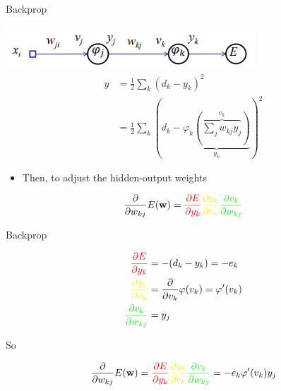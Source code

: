\documentclass[notes]{beamer}
\providecommand{\tightlist}{%
  \setlength{\itemsep}{0pt}\setlength{\parskip}{0pt}}
\begin{document}
\begin{frame}{Backprop}

\centering 

\includegraphics[width=0.70000\textwidth]{2018-03-10-13-49-42.png}\\

\begin{align} 
    y & = \frac{1}{2} \sum_k (d_k - y_k)^2 \\ %
      & =  \frac{1}{2}\sum_k \left(
        d_k - \underbrace{\varphi_k 
        \left( \overbrace{\sum_j w_{kj} y_j}^{v_k} \right)
         }_{y_k}
      \right)^2 
\end{align}

\begin{itemize}
\tightlist
\item
  Then, to adjust the hidden-output weights
\end{itemize}

\begin{equation}
    \frac{\partial }{\partial w_{kj}} E(\vw) = 
    \textcolor{red}{
        \frac{\partial E}{\partial y_k}} 
    \textcolor{yellow}{
        \frac{\partial y_k}{\partial v_k}
    } 
    \textcolor{green}{
        \frac{\partial v_k}{\partial w_{kj}}
    }
\end{equation}

\end{frame}

\begin{frame}{Backprop}

\begin{align}
    \textcolor{red}{
    \frac{\partial E}{\partial y_k}} & = -(d_k - y_k) = -e_k                                           \\
    \textcolor{yellow}{
        \frac{\partial y_k}{\partial v_k}
    }                                & = \frac{\partial }{\partial v_k} \varphi (v_k) = \varphi ' (v_k) \\
    \textcolor{green}{
        \frac{\partial v_k}{\partial w_{kj}}
    }                                & = y_j
\end{align}

So

\begin{equation}
  \frac{\partial }{\partial w_{kj}} E(\vw) = 
    \textcolor{red}{
        \frac{\partial E}{\partial y_k}} 
    \textcolor{yellow}{
        \frac{\partial y_k}{\partial v_k}
    } 
    \textcolor{green}{
        \frac{\partial v_k}{\partial w_{kj}}
    } = -e_k \varphi ' (v_k) y_j 
\end{equation}

\end{frame}
\end{document}
